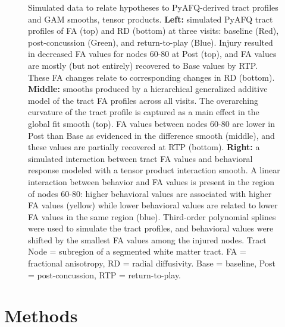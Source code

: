 \documentclass[12pt]{article}
\begin{document}
\begin{figure}[H]
	\centering
	\caption{Simulated data to relate hypotheses to PyAFQ-derived tract profiles and GAM smooths, tensor products. \textbf{Left:} simulated PyAFQ tract profiles of FA (top) and RD (bottom) at three visits: baseline (Red), post-concussion (Green), and return-to-play (Blue). Injury resulted in decreased FA values for nodes 60-80 at Post (top), and FA values are mostly (but not entirely) recovered to Base values by RTP. These FA changes relate to corresponding changes in RD (bottom). \textbf{Middle:} smooths produced by a hierarchical generalized additive model of the tract FA profiles across all visits. The overarching curvature of the tract profile is captured as a main effect in the global fit smooth (top). FA values between nodes 60-80 are lower in Post than Base as evidenced in the difference smooth (middle), and these values are partially recovered at RTP (bottom). \textbf{Right:} a simulated interaction between tract FA values and behavioral response modeled with a tensor product interaction smooth. A linear interaction between behavior and FA values is present in the region of nodes 60-80: higher behavioral values are associated with higher FA values (yellow) while lower behavioral values are related to lower FA values in the same region (blue). Third-order polynomial splines were used to simulate the tract profiles, and behavioral values were shifted by the smallest FA values among the injured nodes. Tract Node = subregion of a segmented white matter tract. FA = fractional anisotropy, RD = radial diffusivity. Base = baseline, Post = post-concussion, RTP = return-to-play.}
	\label{fig:intro-hyp}
\end{figure}


\section{Methods}
\label{sec:meth}
\end{document}

